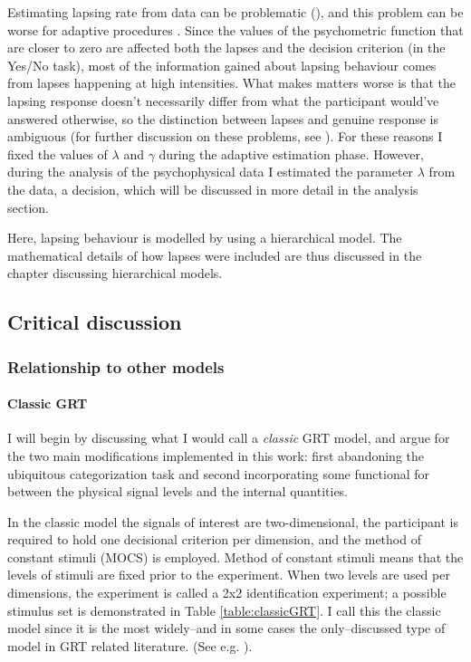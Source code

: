 \documentclass{article}\usepackage{knitr}
\begin{document}
Estimating lapsing rate from data can be problematic (\cite{wichmannhill2001, treutwein1999}), and this problem can be worse for adaptive procedures \citep{prins2012}. Since the values of the psychometric function that are closer to zero are affected both the lapses and the decision criterion (in the Yes/No task), most of the information gained about lapsing behaviour comes from lapses happening at high intensities. What makes matters worse is that the lapsing response doesn't necessarily differ from what the participant would've answered otherwise, so the distinction between lapses and genuine response is ambiguous (for further discussion on these problems, see \cite{prins2012}). For these reasons I fixed the values of $\lambda$ and $\gamma$ during the adaptive estimation phase. However, during the analysis of the psychophysical data I estimated the parameter $\lambda$ from the data, a decision, which will be discussed in more detail in the analysis section.

Here, lapsing behaviour is modelled by using a hierarchical model. The mathematical details of how lapses were included are thus discussed in the chapter discussing hierarchical models. 



\subsection{Critical discussion}

\subsubsection{Relationship to other models}

\paragraph{Classic GRT}

I will begin by discussing what I would call a \textit{classic} GRT model, and argue for the two main modifications implemented in this work: first abandoning the ubiquitous categorization task and second incorporating some functional for between the physical signal levels and the internal quantities. 

In the classic model the signals of interest are two-dimensional, the participant is required to hold one decisional criterion per dimension, and the method of constant stimuli (MOCS) is employed. Method of constant stimuli means that the levels of stimuli are fixed prior to the experiment. When two levels are used per dimensions, the experiment is called a 2x2 identification experiment;  a possible stimulus set is demonstrated in Table \ref{table:classicGRT}. I call this the classic model since it is the most widely--and in some cases the only--discussed type of model in GRT related literature. (See e.g. \cite{ashby2015, ashby1986, cohen2003, kadlec1992, silbert2010, silbert2013}). 
\end{document}
